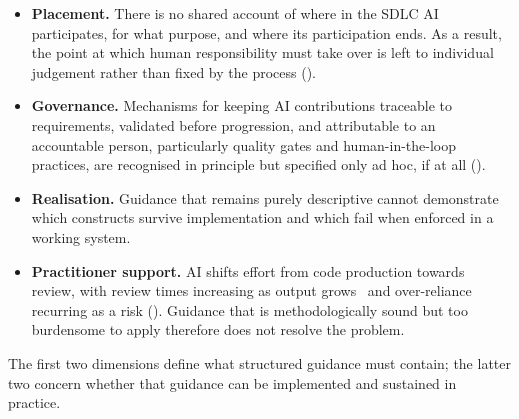\begin{itemize}[leftmargin=0.6cm, itemsep=0.45em]

\item \textbf{Placement.} There is no shared account of where in the \ac{SDLC} AI participates, for what purpose, and where its participation ends. As a result, the point at which human responsibility must take over is left to individual judgement rather than fixed by the process ().

\item \textbf{Governance.} Mechanisms for keeping AI contributions traceable to requirements, validated before progression, and attributable to an accountable person, particularly quality gates and human-in-the-loop practices, are recognised in principle but specified only ad hoc, if at all ().

\item \textbf{Realisation.} Guidance that remains purely descriptive cannot demonstrate which constructs survive implementation and which fail when enforced in a working system.

\item \textbf{Practitioner support.} AI shifts effort from code production towards review, with review times increasing as output grows~\cite{Faros:2025par} and over-reliance recurring as a risk (). Guidance that is methodologically sound but too burdensome to apply therefore does not resolve the problem.

\end{itemize}

The first two dimensions define what structured guidance must contain; the latter two concern whether that guidance can be implemented and sustained in practice.